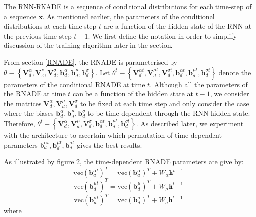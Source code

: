 \documentclass{article} %
\begin{document}
The RNN-RNADE is a sequence of conditional distributions for each time-step of a sequence $\mathbf{x}$. As mentioned earlier, the parameters of the conditional distributions at each time step $t$ are a function of the hidden state of the RNN at the previous time-step $t-1$. We first define the notation in order to simplify discussion of the training algorithm later in the section. 

From section \ref{RNADE}, the RNADE is parameterised by $ \theta \equiv \left\{ \mathbf{V}_{d}^{\alpha},\mathbf{V}_{d}^{\mu},\mathbf{V}_{d}^{\sigma},\mathbf{b}^{\alpha}_{d},\mathbf{b}^{\mu}_{d},\mathbf{b}^{\sigma}_{d} \right\}$. Let  $ \theta^t \equiv \left\{ \mathbf{V}_{d}^{\alpha t},\mathbf{V}_{d}^{\mu t},\mathbf{V}_{d}^{\sigma t},\mathbf{b}^{\alpha t}_{d},\mathbf{b}^{\mu t}_{d},\mathbf{b}^{\sigma t}_{d} \right\}$ denote the parameters of the conditional RNADE at time $t$. Although all the parameters of the RNADE at time $t$ can be a function of the hidden state at $t-1$, we consider the matrices $ \mathbf{V}_{d}^{\alpha},\mathbf{V}_{d}^{\mu},\mathbf{V}_{d}^{\sigma}$ to be fixed at each time step and only consider the case where the biases $\mathbf{b}^{\alpha}_{d},\mathbf{b}^{\mu}_{d},\mathbf{b}^{\sigma}_{d}$ to be time-dependent through the RNN hidden state. Therefore, $ \theta^t \equiv \left\{ \mathbf{V}_{d}^{\alpha},\mathbf{V}_{d}^{\mu},\mathbf{V}_{d}^{\sigma},\mathbf{b}^{\alpha t}_{d},\mathbf{b}^{\mu t}_{d},\mathbf{b}^{\sigma t}_{d} \right\}$. As described later, we experiment with the architecture to ascertain which permutation of time dependent parameters $\mathbf{b}^{\alpha t}_{d},\mathbf{b}^{\mu t}_{d},\mathbf{b}^{\sigma t}_{d}$ gives the best results.  

As illustrated by figure 2, the time-dependent RNADE parameters are give by:
$$ {\mathrm{vec}(\mathbf{b}^{\alpha t}_{d})}^{T} = {\mathrm{vec}(\mathbf{b}^{\alpha}_{d})}^{T} + W_{\alpha}\mathbf{h}^{t-1}$$
$$ {\mathrm{vec}(\mathbf{b}^{\mu t}_{d})}^T = {\mathrm{vec}(\mathbf{b}^{\mu}_{d})}^T + W_{\mu}\mathbf{h}^{t-1}$$
$$ {\mathrm{vec}(\mathbf{b}^{\sigma t}_{d})}^T = {\mathrm{vec}(\mathbf{b}^{\sigma}_{d})}^T + W_{\sigma}\mathbf{h}^{t-1}$$
where 



\end{document}
